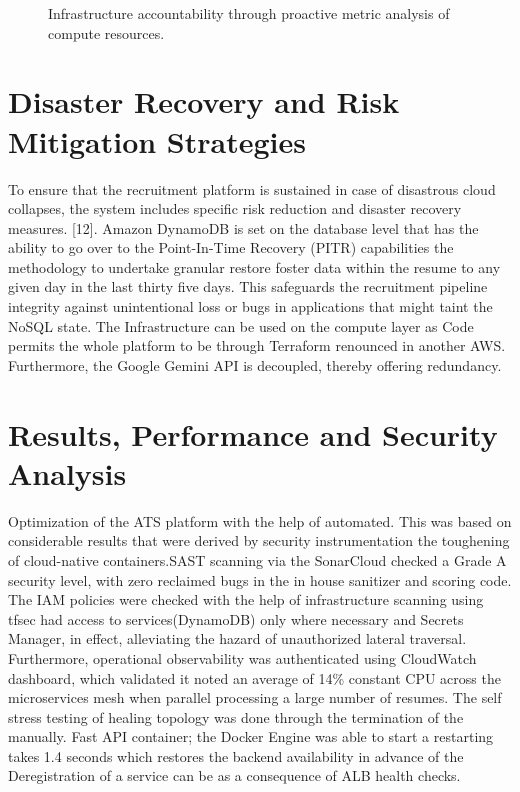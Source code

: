 \documentclass[conference]{IEEEtran}
\begin{document}
\begin{figure}[ht!]
\centering
{}
\caption{Infrastructure accountability through proactive metric analysis of compute resources.}
\label{fig:cloudwatch}
\end{figure}

\section{Disaster Recovery and Risk Mitigation Strategies} 
To ensure that the recruitment platform is sustained in case of disastrous cloud collapses, the system includes specific risk reduction and disaster recovery measures. [12]. Amazon DynamoDB is set on the database level that has the ability to go over to the Point-In-Time Recovery (PITR) capabilities the methodology to undertake granular restore foster data within the resume to any given day in the last thirty five days. This safeguards the recruitment pipeline integrity against unintentional loss or bugs in applications that might taint the NoSQL state. The Infrastructure can be used on the compute layer as Code permits the whole platform to be through Terraform renounced in another AWS. Furthermore, the Google Gemini API is decoupled, thereby offering redundancy.

\section{Results, Performance and Security Analysis}
Optimization of the ATS platform with the help of automated. This was based on considerable results that were derived by security instrumentation the toughening of cloud-native containers.SAST scanning via the SonarCloud checked a Grade A security level, with zero reclaimed bugs in the in house sanitizer and scoring code. The IAM policies were checked with the help of infrastructure scanning using tfsec had access to services(DynamoDB) only where necessary and Secrets Manager, in effect, alleviating the hazard of unauthorized lateral traversal. Furthermore, operational observability was authenticated using CloudWatch dashboard, which validated it noted an average of 14\% constant CPU across the microservices mesh when parallel processing a large number of resumes. The self stress testing of healing topology was done through the termination of the manually. Fast API container; the Docker Engine was able to start a restarting takes 1.4 seconds which restores the backend availability in advance of the Deregistration of a service can be as a consequence of ALB health checks. 
\end{document}
